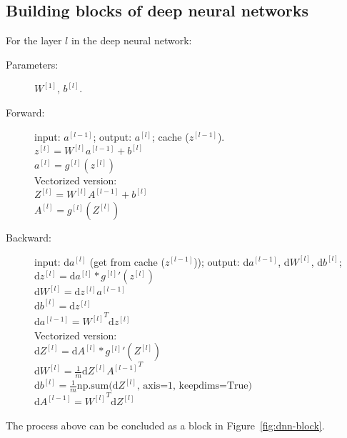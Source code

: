 \documentclass[UTF8]{article}
\newcommand{\Vector}[1]{\boldsymbol{\mathit{#1}}}   %
\newcommand{\Matrix}[1]{\boldsymbol{\mathit{#1}}}   %
\begin{document}
\subsection{Building blocks of deep neural networks}
For the layer $l$ in the deep neural network:
\begin{description}
    \item[Parameters:] $\Matrix{W}^{[1]}$, $\Vector{b}^{[l]}$.
    \item[Forward:] input: $\Vector{a}^{[l-1]}$; output: $\Vector{a}^{[l]}$;
    cache ($\Vector{z^{[l-1]}}$). \\
    $\Vector{z}^{[l]} = \Matrix{W}^{[l]} \Vector{a}^{[l-1]} + \Vector{b}^{[l]}$ \\
    $\Vector{a}^{[l]} = g^{[l]}(\Vector{z}^{[l]})$ \\
    Vectorized version: \\
    $\Matrix{Z}^{[l]} = \Matrix{W}^{[l]} \Matrix{A}^{[l-1]} + \Vector{b}^{[l]}$ \\
    $\Matrix{A}^{[l]} = g^{[l]}(\Matrix{Z}^{[l]})$
    \item[Backward:] input: d$\Vector{a}^{[l]}$ (get from cache ($\Vector{z^{[l-1]}}$));
    output: d$\Vector{a}^{[l-1]}$, d$\Matrix{W}^{[l]}$, d$\Vector{b}^{[l]}$; \\
    d$\Vector{z}^{[l]} = \text{d}\Vector{a}^{[l]} * {g^{[l]}}'(\Vector{z}^{[l]})$ \\
    d$\Matrix{W}^{[l]} = \text{d}\Vector{z}^{[l]} \Vector{a}^{[l-1]}$ \\
    d$\Vector{b}^{[l]} = \text{d}\Vector{z}^{[l]}$ \\
    d$\Vector{a}^{[l-1]} = {\Matrix{W}^{[l]}}^T \text{d}\Vector{z}^{[l]}$ \\
    Vectorized version: \\
    d$\Matrix{Z}^{[l]} = \text{d}\Matrix{A}^{[l]} * {g^{[l]}}'(\Matrix{Z}^{[l]})$ \\
    d$\Matrix{W}^{[l]} = \frac{1}{m} \text{d}\Matrix{Z}^{[l]} {\Matrix{A}^{[l-1]}}^T$ \\
    d$\Vector{b}^{[l]}
        = \frac{1}{m} \text{np.sum(d} \Matrix{Z}^{[l]} \text{, axis=1, keepdims=True)}$ \\
    d$\Matrix{A}^{[l-1]} = {\Matrix{W}^{[l]}}^T \text{d}\Matrix{Z}^{[l]}$
\end{description}

The process above can be concluded as a block in Figure~\ref{fig:dnn-block}.
\end{document}
